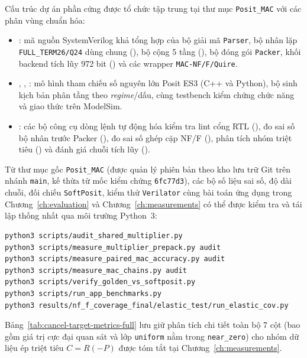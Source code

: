 Cấu trúc dự án phần cứng được tổ chức tập trung tại thư mục \texttt{Posit\_MAC}
với các phân vùng chuẩn hóa:
\begin{itemize}\raggedright
  \item {}: mã nguồn SystemVerilog khả tổng hợp của bộ giải mã \texttt{Parser},
        bộ nhân lặp \texttt{FULL\_TERM26/Q24} dùng chung (),
        bộ cộng 5 tầng (), bộ đóng gói \texttt{Packer}, khối backend
        tích lũy 972 bit () và các wrapper \texttt{MAC-NF/F/Quire}.
  \item {}, , : mô hình tham chiếu số nguyên lớn Posit
        ES3 (C++ và Python), bộ sinh kịch bản phân tầng theo \textit{regime}/dấu,
        cùng testbench kiểm chứng chức năng và giao thức trên ModelSim.
  \item {}: các bộ công cụ dòng lệnh tự động hóa kiểm tra lint cổng
        RTL (), đo sai số bộ nhân trước Packer
        (), đo sai số ghép cặp NF/F
        (), phân tích nhóm triệt tiêu
        () và đánh giá chuỗi tích lũy
        ().
\end{itemize}

Từ thư mục gốc \texttt{Posit\_MAC} (được quản lý phiên bản theo kho lưu trữ Git trên
nhánh \texttt{main}, kế thừa từ mốc kiểm chứng \texttt{6fc77d3}), các bộ số liệu
sai số, độ dài chuỗi, đối chiếu \texttt{SoftPosit}, kiểm thử \texttt{Verilator}
cùng bài toán ứng dụng trong Chương~\ref{ch:evaluation} và Chương~\ref{ch:measurements}
có thể được kiểm tra và tái lập thống nhất qua môi trường Python~3:
\begin{verbatim}
python3 scripts/audit_shared_multiplier.py
python3 scripts/measure_multiplier_prepack.py audit
python3 scripts/measure_paired_mac_accuracy.py audit
python3 scripts/measure_mac_chains.py audit
python3 scripts/verify_golden_vs_softposit.py
python3 scripts/run_app_benchmarks.py
python3 results/nf_f_coverage_final/elastic_test/run_elastic_cov.py
\end{verbatim}

Bảng~\ref{tab:cancel-target-metrics-full} lưu giữ phân tích chi tiết toàn bộ 7 cột
(bao gồm giá trị cực đại quan sát và lớp \texttt{uniform} nằm trong \texttt{near\_zero})
cho nhóm dữ liệu ép triệt tiêu $C=R(-P)$ được tóm tắt tại Chương~\ref{ch:measurements}.

